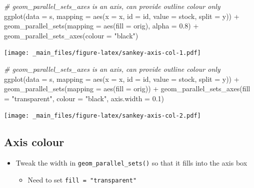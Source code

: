 \documentclass[
]{book}
\newenvironment{Shaded}{\begin{snugshade}}{\end{snugshade}}
\newcommand{\AttributeTok}[1]{\textcolor[rgb]{0.77,0.63,0.00}{#1}}
\newcommand{\CommentTok}[1]{\textcolor[rgb]{0.56,0.35,0.01}{\textit{#1}}}
\newcommand{\FloatTok}[1]{\textcolor[rgb]{0.00,0.00,0.81}{#1}}
\newcommand{\FunctionTok}[1]{\textcolor[rgb]{0.00,0.00,0.00}{#1}}
\newcommand{\NormalTok}[1]{#1}
\newcommand{\SpecialCharTok}[1]{\textcolor[rgb]{0.00,0.00,0.00}{#1}}
\newcommand{\StringTok}[1]{\textcolor[rgb]{0.31,0.60,0.02}{#1}}
\providecommand{\tightlist}{%
  \setlength{\itemsep}{0pt}\setlength{\parskip}{0pt}}
\begin{document}
\begin{Shaded}
\begin{Highlighting}[]
\CommentTok{\# geom\_parallel\_sets\_axes is an axis, can provide outline colour only}
\FunctionTok{ggplot}\NormalTok{(}\AttributeTok{data =}\NormalTok{ s, }\AttributeTok{mapping =} \FunctionTok{aes}\NormalTok{(}\AttributeTok{x =}\NormalTok{ x, }\AttributeTok{id =}\NormalTok{ id, }\AttributeTok{value =}\NormalTok{ stock, }\AttributeTok{split =}\NormalTok{ y)) }\SpecialCharTok{+}
  \FunctionTok{geom\_parallel\_sets}\NormalTok{(}\AttributeTok{mapping =} \FunctionTok{aes}\NormalTok{(}\AttributeTok{fill =}\NormalTok{ orig), }\AttributeTok{alpha =} \FloatTok{0.8}\NormalTok{) }\SpecialCharTok{+}
  \FunctionTok{geom\_parallel\_sets\_axes}\NormalTok{(}\AttributeTok{colour =} \StringTok{"black"}\NormalTok{)}
\end{Highlighting}
\end{Shaded}

\texttt{[image: \_main\_files/figure-latex/sankey-axis-col-1.pdf]}

\begin{Shaded}
\begin{Highlighting}[]
\CommentTok{\# geom\_parallel\_sets\_axes is an axis, can provide outline colour only}
\FunctionTok{ggplot}\NormalTok{(}\AttributeTok{data =}\NormalTok{ s, }\AttributeTok{mapping =} \FunctionTok{aes}\NormalTok{(}\AttributeTok{x =}\NormalTok{ x, }\AttributeTok{id =}\NormalTok{ id, }\AttributeTok{value =}\NormalTok{ stock, }\AttributeTok{split =}\NormalTok{ y)) }\SpecialCharTok{+}
  \FunctionTok{geom\_parallel\_sets}\NormalTok{(}\AttributeTok{mapping =} \FunctionTok{aes}\NormalTok{(}\AttributeTok{fill =}\NormalTok{ orig)) }\SpecialCharTok{+}
  \FunctionTok{geom\_parallel\_sets\_axes}\NormalTok{(}\AttributeTok{fill =} \StringTok{"transparent"}\NormalTok{, }\AttributeTok{colour =} \StringTok{"black"}\NormalTok{, }
                            \AttributeTok{axis.width =} \FloatTok{0.1}\NormalTok{)}
\end{Highlighting}
\end{Shaded}

\texttt{[image: \_main\_files/figure-latex/sankey-axis-col-2.pdf]}

\hypertarget{axis-colour-1}{%
\subsection{Axis colour}\label{axis-colour-1}}

\begin{itemize}
\tightlist
\item
  Tweak the width in \texttt{geom\_parallel\_sets()} so that it fills into the axis box

  \begin{itemize}
  \tightlist
  \item
    Need to set \texttt{fill\ =\ "transparent"}
  \end{itemize}
\end{itemize}
\end{document}
